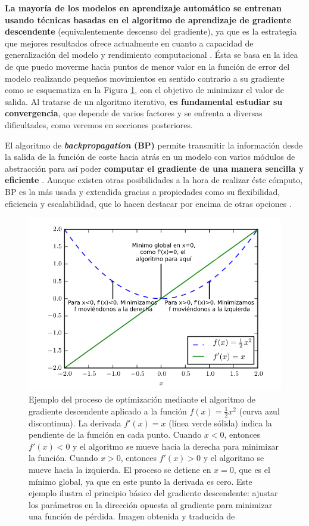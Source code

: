 \textbf{La mayoría de los modelos en aprendizaje automático se entrenan usando técnicas basadas en el algoritmo de aprendizaje de gradiente descendente} (equivalentemente descenso del gradiente), ya que es la estrategia que mejores resultados ofrece actualmente en cuanto a capacidad de generalización del modelo y rendimiento computacional \cite{GoodFellowBook, CauchyGD}. Ésta se basa en la idea de que puedo moverme hacia puntos de menor valor en la función de error del modelo realizando pequeños movimientos en  sentido contrario a su gradiente como se esquematiza en la Figura \ref{fig:1.GD}, con el objetivo de minimizar el valor de salida. Al tratarse de un algoritmo iterativo, \textbf{es fundamental estudiar su convergencia}, que depende de varios factores y se enfrenta a diversas dificultades, como veremos en secciones posteriores.

El algoritmo de \textbf{\textit{backpropagation} (BP)} permite transmitir la información desde la salida de la función de coste hacia atrás en un modelo con varios módulos de abstracción para así poder \textbf{computar el gradiente de una manera sencilla y eficiente} \cite{rumelbackprop}. Aunque existen otras posibilidades a la hora de realizar éste cómputo, BP es la más usada y extendida gracias a propiedades como su flexibilidad, eficiencia y escalabilidad, que lo hacen destacar por encima de otras opciones \cite{GoodFellowBook}. 

\begin{figure}
    \centering
    \includegraphics[width=0.75\linewidth]{Plantilla_TFG_latex//imagenes//Mat//1.intro/1.1GDMatIntroGoodFellowBook.png}
    \caption[Ejemplo del proceso de optimización mediante el algoritmo de gradiente descendente]{Ejemplo del proceso de optimización mediante el algoritmo de gradiente descendente aplicado a la función $f(x)=\frac{1}{2}x^2$  (curva azul discontinua). La derivada $f'(x)=x$ (línea verde sólida) indica la pendiente de la función en cada punto. Cuando $x<0$, entonces $f'(x)<0$ y el algoritmo se mueve hacia la derecha para minimizar la función. Cuando $x>0$, entonces $f'(x)>0$ y el algoritmo se mueve hacia la izquierda. El proceso se detiene en $x=0$, que es el mínimo global, ya que en este punto la derivada es cero. Este ejemplo ilustra el principio básico del gradiente descendente: ajustar los parámetros en la dirección opuesta al gradiente para minimizar una función de pérdida. Imagen obtenida y traducida de \cite{GoodFellowBook}}
    \label{fig:1.GD}
\end{figure}




